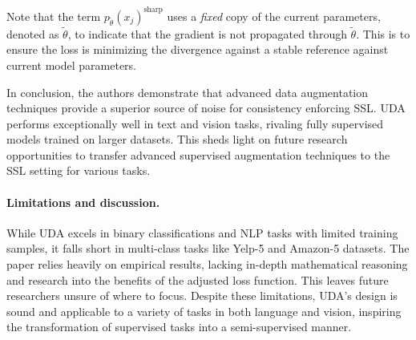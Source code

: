\documentclass{article}
\begin{document}
Note that the term $p_{\tilde{{\theta}}}(x_j)^{\text{sharp}}$ uses a \textit{fixed} copy of the current parameters, 
denoted as $\tilde{\theta}$, to indicate that the gradient is not propagated through $\tilde{\theta}$.
This is to ensure the loss is minimizing the divergence against a stable reference against
current model parameters.

In conclusion, the authors demonstrate that advanced data augmentation techniques 
provide a superior source of noise for consistency enforcing SSL. UDA performs 
exceptionally well in text and vision tasks, rivaling fully supervised models trained 
on larger datasets. This sheds light on future research opportunities to transfer 
advanced supervised augmentation techniques to the SSL setting for various tasks.

\paragraph{Limitations and discussion.}
While UDA excels in binary classifications and NLP tasks with limited training samples, 
it falls short in multi-class tasks like Yelp-5 and Amazon-5 datasets. The paper 
relies heavily on empirical results, lacking in-depth mathematical reasoning and 
research into the benefits of the adjusted loss function. This leaves future 
researchers unsure of where to focus. Despite these limitations, UDA's design is 
sound and applicable to a variety of tasks in both language and vision, inspiring the 
transformation of supervised tasks into a semi-supervised manner.
\end{document}
